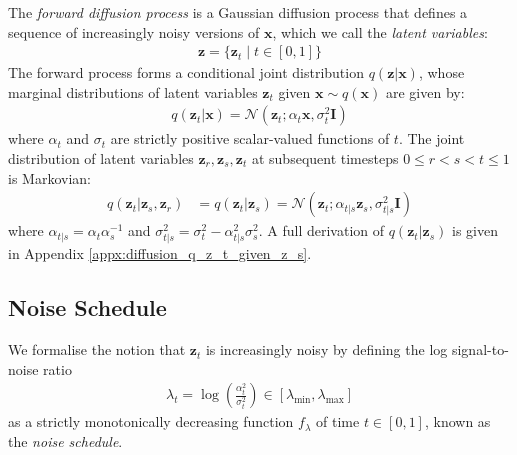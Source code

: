 \documentclass[ oneside,%
                    author={George Herbert},
                    degree={MSci},
                     title={Video Diffusion Models for Climate Simulations},
                  subtitle={}]{dissertation}
\begin{document}
The \textit{forward diffusion process} is a Gaussian diffusion process that defines a sequence of increasingly noisy versions of $\mathbf{x}$, which we call the \textit{latent variables}:
\begin{align}
      \mathbf{z}=\{\mathbf{z}_t\mid t\in[0,1]\}
\end{align}
The forward process forms a conditional joint distribution $q(\mathbf{z}|\mathbf{x})$, whose marginal distributions of latent variables $\mathbf{z}_t$ given $\mathbf{x}\sim q(\mathbf{x})$ are given by:
\begin{align}
      q(\mathbf{z}_t|\mathbf{x})=\mathcal{N}\left(\mathbf{z}_t;\alpha_t\mathbf{x},\sigma_t^2\mathbf{I}\right)
      \label{eq:q_z_t_given_x}
\end{align}
where $\alpha_t$ and $\sigma_t$ are strictly positive scalar-valued functions of $t$. The joint distribution of latent variables $\mathbf{z}_r,\mathbf{z}_s,\mathbf{z}_t$ at subsequent timesteps $0\le r < s < t \le 1$ is Markovian:
\begin{align}
      q(\mathbf{z}_t|\mathbf{z}_s,\mathbf{z}_r)&=q(\mathbf{z}_t|\mathbf{z}_s)=\mathcal{N}\left(\mathbf{z}_t; \alpha_{t|s}\mathbf{z}_s, \sigma_{t|s}^2\mathbf{I}\right)
\end{align}
where $\alpha_{t|s}=\alpha_t\alpha_s^{-1}$ and $\sigma_{t|s}^2=\sigma_t^2-\alpha_{t|s}^2\sigma_s^2$. A full derivation of $q(\mathbf{z}_t|\mathbf{z}_s)$ is given in Appendix \ref{appx:diffusion_q_z_t_given_z_s}.

\subsection{Noise Schedule}
\label{sec:background_diffusion_noise_schedule}

We formalise the notion that $\mathbf{z}_t$ is increasingly noisy by defining the log signal-to-noise ratio
\begin{align}
      \lambda_t = \log\left( \frac{\alpha_t^2}{\sigma_t^2}\right)\in[\lambda_{\min}, \lambda_{\max}]
\end{align}
as a strictly monotonically decreasing function $f_{\lambda}$ of time $t\in[0, 1]$, known as the \textit{noise schedule}.
\end{document}
